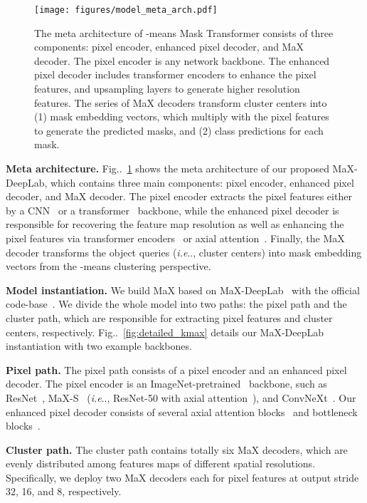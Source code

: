 \documentclass[runningheads]{llncs}
\makeatletter
\DeclareRobustCommand\onedot{\futurelet\@let@token\@onedot}
\def\@onedot{\ifx\@let@token.\else.\null\fi\xspace}
\def\ie{\emph{i.e}\onedot} \def\Ie{\emph{I.e}\onedot}
\newcommand{\figref}[1]{Fig\onedot~\ref{#1}}
\makeatother
\begin{document}
\begin{figure}[!t]
    \centering
    \texttt{[image: figures/model\_meta\_arch.pdf]}
    \caption{The meta architecture of -means Mask Transformer consists of three components: pixel encoder, enhanced pixel decoder, and MaX decoder. The pixel encoder is any network backbone. The enhanced pixel decoder includes transformer encoders to enhance the pixel features, and upsampling layers to generate higher resolution features. The series of MaX decoders transform cluster centers into (1) mask embedding vectors, which multiply with the pixel features to generate the predicted masks, and (2) class predictions for each mask.
    }
    \label{fig:meta_arch}
\end{figure}

{\bf Meta architecture.}\quad
\figref{fig:meta_arch} shows the meta architecture of our proposed MaX-DeepLab, which contains three main components: pixel encoder, enhanced pixel decoder, and MaX decoder. The pixel encoder extracts the pixel features either by a CNN~\cite{he2016deep} or a transformer~\cite{liu2021swin} backbone, while the enhanced pixel decoder is responsible for recovering the feature map resolution as well as enhancing the pixel features via transformer encoders~\cite{vaswani2017attention} or axial attention~\cite{wang2020axial}. Finally, the MaX decoder transforms the object queries (\ie, cluster centers) into mask embedding vectors from the -means clustering perspective.

{\bf Model instantiation.}\quad
We build MaX based on MaX-DeepLab~\cite{wang2021max} with the official code-base~\cite{deeplab2_2021}. We divide the whole model into two paths: the pixel path and the cluster path, which are responsible for extracting pixel features and cluster centers, respectively. \figref{fig:detailed_kmax} details our MaX-DeepLab instantiation with two example backbones.

\textbf{Pixel path.}\quad
The pixel path consists of a pixel encoder and an enhanced pixel decoder. The pixel encoder is an ImageNet-pretrained~\cite{russakovsky2015imagenet} backbone, such as ResNet~\cite{he2016deep}, MaX-S~\cite{wang2021max} (\ie, ResNet-50 with axial attention~\cite{wang2020axial}), and ConvNeXt~\cite{liu2022convnet}. Our enhanced pixel decoder consists of several axial attention blocks~\cite{wang2020axial} and bottleneck blocks~\cite{he2016deep}.

\textbf{Cluster path.}\quad
The cluster path contains totally six MaX decoders, which are evenly distributed among features maps of different spatial resolutions. Specifically, we deploy two MaX decoders each for pixel features at output stride 32, 16, and 8, respectively.
\end{document}
